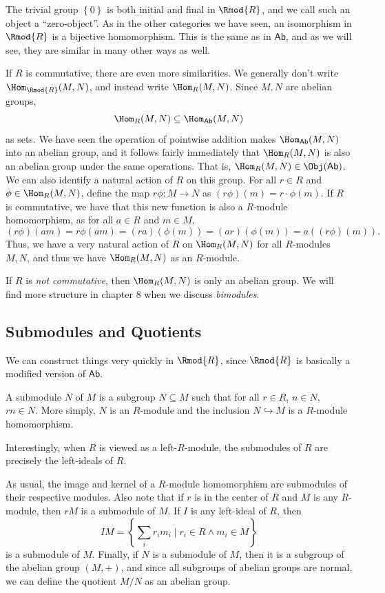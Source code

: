 The trivial group $\left\{ 0 \right\} $ is both initial and final in $\Rmod{R} $, and we call such an object a ``zero-object''. As in the other categories we have seen, an isomorphism in $\Rmod{R} $ is a bijective homomorphism. This is the same as in $\mathsf{Ab}$, and as we will see, they are similar in many other ways as well.

If $R$ is commutative, there are even more similarities. We generally don't write $\Hom_{\Rmod{R}}(M , N) $, and instead write $\Hom_R( M,N )$. Since $M,N$ are abelian groups,
\[
	\Hom_{R}(M , N) \subseteq \Hom_{\mathsf{Ab}}(M , N) 
\]
as sets. We have seen the operation of pointwise addition makes $\Hom_{\mathsf{Ab}}(M , N) $ into an abelian group, and it follows fairly immediately that $\Hom_{R}(M , N) $ is also an abelian group under the same operations. That is, $\Hom_{R}(M , N) \in \Obj(\mathsf{ Ab }) $. We can also identify a natural action of $R$ on this group. For all $r\in R$ and $\phi \in \Hom_{R}(M , N) $, define the map $r\phi : M \to N$ as $(r\phi )(m)=r\cdot \phi (m)$. If $R$ is commutative, we have that this new function is also a $R$-module homomorphism, as for all $a\in R$ and $m\in M$,
\[
	(r\phi )(am)=r\phi (am)=(ra)(\phi (m))=(ar)(\phi (m))=a( (r\phi )(m))
.\]
Thus, we have a very natural action of $R$ on $\Hom_{R}(M , N) $ for all $R$-modules $M,N$, and thus we have $\Hom_{R}(M , N)$ as an $R$-module.

If $R$ is \emph{not commutative}, then $\Hom_{R}(M , N) $ is only an abelian group. We will find more structure in chapter 8 when we discuss \emph{bimodules}.

\subsection{Submodules and Quotients}
We can construct things very quickly in $\Rmod{R} $, since $\Rmod{R} $ is basically a modified version of $\mathsf{Ab}$.

A submodule $N$ of $M$ is a subgroup $N\subseteq M$ such that for all $r\in R$, $n\in N$, $rn\in N$. More simply, $N$ is an $R$-module and the inclusion $N\hookrightarrow M$ is a $R$-module homomorphism.

Interestingly, when $R$ is viewed as a left-$R$-module, the submodules of $R$ are precisely the left-ideals of $R$.

As usual, the image and kernel of a $R$-module homomorphism are submodules of their respective modules. Also  note that if $r$ is in the center of $R$ and $M$ is any $R$-module, then $rM$ is a submodule of $M$. If $I$ is any left-ideal of $R$, then
\[
	IM = \left\{ \sum_{i} r_im_i \mid r_i\in R \land m_i\in M \right\} 
\]
is a submodule of $M$. Finally, if $N$ is a submodule of $M$, then it is a subgroup of the abelian group $(M,+)$, and since all subgroups of abelian groups are normal, we can define the quotient $M /N$ as an abelian group.

